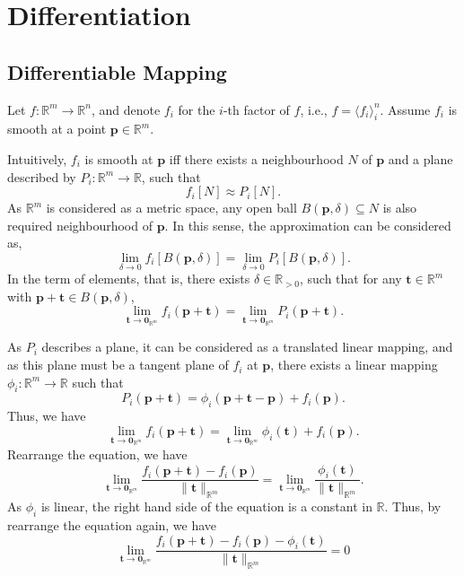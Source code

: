 
\chapter{Differentiation}


\section{Differentiable Mapping}


\begin{observation}
	Let $f : \mathbb R^m \to \mathbb R^n$, and denote $f_i$ for the $i$-th factor of $f$, i.e., $f = \langle f_i \rangle_i^n$. Assume $f_i$ is smooth at a point $\mathbf p \in \mathbb R^m$.

	Intuitively, $f_i$ is smooth at $\mathbf p$ iff there exists a neighbourhood $N$ of $\mathbf p$ and a plane described by $P_i: \mathbb R^m \to \mathbb R$, such that
	$$
		f_i[N] \approx P_i[N].
	$$
	As $\mathbb R^m$ is considered as a metric space, any open ball $B(\mathbf p, \delta) \subseteq N$ is also required neighbourhood of $\mathbf p$. In this sense, the approximation can be considered as,
	$$
	\lim_{\delta \to 0} f_i[B(\mathbf p, \delta)] = \lim_{\delta \to 0} P_i[B(\mathbf p, \delta)].
	$$
	In the term of elements, that is, there exists $\delta \in \mathbb R_{> 0}$, such that for any $\mathbf t \in \mathbb R^m$ with $\mathbf p + \mathbf t \in B(\mathbf p, \delta)$,	
	$$
	\lim_{\mathbf t \to \mathbf 0_{\mathbb R^m}} f_i(\mathbf p + \mathbf t) = \lim_{\mathbf t \to \mathbf 0_{\mathbb R^m}} P_i(\mathbf p + \mathbf t).
	$$
	
	As $P_i$ describes a plane, it can be considered as a translated linear mapping, and as this plane must be a tangent plane of $f_i$ at $\mathbf p$, there exists a linear mapping $\phi_i: \mathbb R^m \to \mathbb R$ such that
	$$
	P_i(\mathbf p + \mathbf t) = \phi_i(\mathbf p + \mathbf t - \mathbf p) + f_i(\mathbf p).
	$$
	Thus, we have
	$$
	\lim_{\mathbf t \to \mathbf 0_{\mathbb R^m}} f_i(\mathbf p + \mathbf t) = \lim_{\mathbf t \to \mathbf 0_{\mathbb R^m}}\phi_i(\mathbf t) + f_i(\mathbf p).
	$$
	Rearrange the equation, we have
	$$
	\lim_{\mathbf t \to \mathbf 0_{\mathbb R^m}} \frac{f_i(\mathbf p + \mathbf t) - f_i(\mathbf p)}{\| \mathbf t \|_{\mathbb R^m}} = \lim_{\mathbf t \to \mathbf 0_{\mathbb R^m}} \frac{\phi_i(\mathbf t)}{\| \mathbf t \|_{\mathbb R^m}}.
	$$
	As $\phi_i$ is linear, the right hand side of the equation is a constant in $\mathbb R$. Thus, by rearrange the equation again, we have
	$$
	\lim_{\mathbf t \to \mathbf 0_{\mathbb R^m}} \frac{f_i(\mathbf p + \mathbf t) - f_i(\mathbf p) - \phi_i(\mathbf t)}{\|\mathbf t\|_{\mathbb R^m}} = 0
	$$
	

\end{observation}

